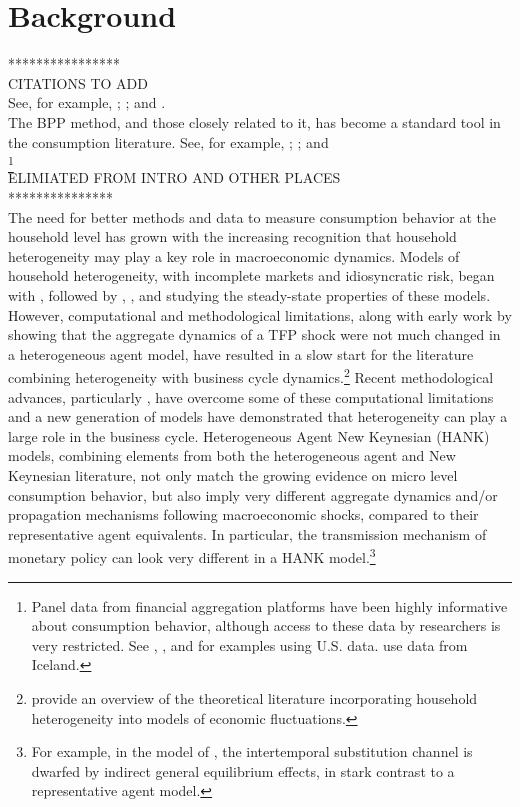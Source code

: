 \documentclass[titlepage]{\econtex}\newcommand{\texname}{ConsumptionHeterogeneity}
\begin{document}
	\section{Background}
	****************\\
	CITATIONS TO ADD\\
	See, for example, \cite{kaplan_monetary_2016}; \cite{garriga_mortgages_2017}; and \cite{greenwald_mortgage_2018}.\\
	The BPP method, and those closely related to it, has become a standard tool in the consumption literature. See, for example, \cite{violante_wealthy_2014}; \cite{auclert_monetary_2017}; and \cite{manovskii_how_2017} \\
	\footnote{Panel data from financial aggregation platforms have been highly informative about consumption behavior, although access to these data by researchers is very restricted. See \cite{gelman_harnessing_2014}, \cite{ganong_consumer_2017}, and \cite{baker_debt_2015} for examples using U.S. data. \cite{vardardottir_liquid_2016} use data from Iceland.} \\
	ELIMIATED FROM INTRO AND OTHER PLACES\\
	***************\\
	The need for better methods and data to measure consumption behavior at the household level has grown with the increasing recognition that household heterogeneity may play a key role in macroeconomic dynamics. Models of household heterogeneity, with incomplete markets and idiosyncratic risk, began with \cite{bewley_difficulty_1983}, followed by \cite{imrohoroglu_cost_1989}, \cite{huggett_risk_1993}, and \cite{aiyagari_uninsured_1994} studying the steady-state properties of these models. However, computational and methodological limitations, along with early work by \cite{krusell_income_1998} showing that the aggregate dynamics of a TFP shock were not much changed in a heterogeneous agent model, have resulted in a slow start for the literature combining heterogeneity with business cycle dynamics.\footnote{\cite{kaplan_microeconomic_2018} provide an overview of the theoretical literature incorporating household heterogeneity into models of economic fluctuations.} Recent methodological advances, particularly \cite{reiter_solving_2009}, have overcome some of these computational limitations and a new generation of models have demonstrated that heterogeneity can play a large role in the business cycle. Heterogeneous Agent New Keynesian (HANK) models, combining elements from both the heterogeneous agent and New Keynesian literature, not only match the growing evidence on micro level consumption behavior, but also imply very different aggregate dynamics and/or propagation mechanisms following macroeconomic shocks, compared to their representative agent equivalents. In particular, the transmission mechanism of monetary policy can look very different in a HANK model.\footnote{For example, in the model of \cite{kaplan_monetary_2016}, the intertemporal substitution channel is dwarfed by indirect general equilibrium effects, in stark contrast to a representative agent model.}
	
\end{document}
